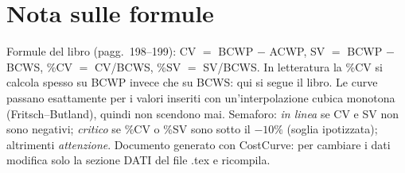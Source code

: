 \documentclass[a4paper,10pt]{article}
\begin{document}
\section*{\large Nota sulle formule}
{\footnotesize
Formule del libro (pagg.~198--199): CV $=$ BCWP $-$ ACWP, SV $=$ BCWP $-$ BCWS, \%CV $=$ CV/BCWS, \%SV $=$ SV/BCWS. In letteratura la \%CV si calcola spesso su BCWP invece che su BCWS: qui si segue il libro.
Le curve passano esattamente per i valori inseriti con un'interpolazione cubica monotona (Fritsch--Butland), quindi non scendono mai.
Semaforo: \emph{in linea} se CV e SV non sono negativi; \emph{critico} se \%CV o \%SV sono sotto il $-10\%$ (soglia ipotizzata); altrimenti \emph{attenzione}.
Documento generato con CostCurve: per cambiare i dati modifica solo la sezione DATI del file .tex e ricompila.\par}
\end{document}

